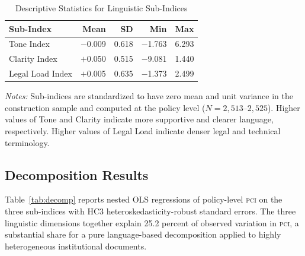 \documentclass[12pt]{article}
\newcommand{\PCI}{\textsc{pci}}
\begin{document}
\begin{table}[H]
\centering
\caption{Descriptive Statistics for Linguistic Sub-Indices}
\label{tab:subindices}
\begin{threeparttable}
\small
\begin{tabular}{lrrrr}
\toprule
\textbf{Sub-Index} & \textbf{Mean} & \textbf{SD} & \textbf{Min} & \textbf{Max} \\
\midrule
Tone Index        & $-$0.009 & 0.618 & $-$1.763 & 6.293 \\
Clarity Index     & $+$0.050 & 0.515 & $-$9.081 & 1.440 \\
Legal Load Index  & $+$0.005 & 0.635 & $-$1.373 & 2.499 \\
\bottomrule
\end{tabular}
\begin{tablenotes}
\small
\item \textit{Notes:} Sub-indices are standardized to have zero mean and unit variance
  in the construction sample and computed at the policy level ($N = 2{,}513$--$2{,}525$).
  Higher values of Tone and Clarity indicate more supportive and clearer language,
  respectively.  Higher values of Legal Load indicate denser legal and technical
  terminology.
\end{tablenotes}
\end{threeparttable}
\end{table}

\subsection{Decomposition Results}

Table~\ref{tab:decomp} reports nested OLS regressions of policy-level \PCI{} on the
three sub-indices with HC3 heteroskedasticity-robust standard errors.  The three
linguistic dimensions together explain 25.2 percent of observed variation in \PCI,
a substantial share for a pure language-based decomposition applied to highly
heterogeneous institutional documents.
\end{document}

